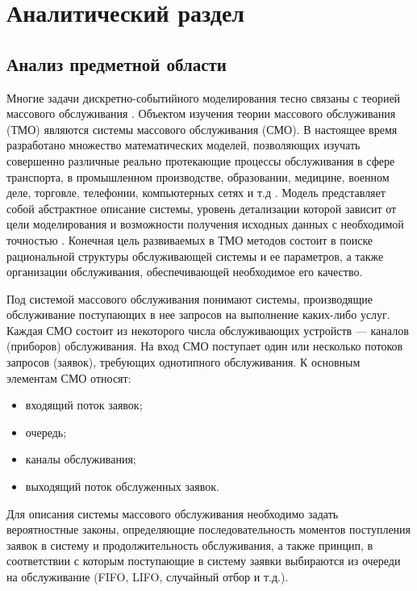 \chapter{Аналитический раздел}

\section{Анализ предметной области}
Многие задачи дискретно-событийного моделирования тесно связаны с теорией
массового обслуживания \cite{imitation_modelling_def}. Объектом изучения теории массового обслуживания (ТМО) являются системы массового обслуживания (СМО). В настоящее время разработано множество математических моделей, позволяющих изучать совершенно различные реально протекающие процессы обслуживания в сфере транспорта, в промышленном производстве, образовании, медицине, военном деле, торговле, телефонии, компьютерных сетях и т.д \cite{gpss}. Модель представляет собой абстрактное описание системы, уровень детализации которой зависит от цели моделирования и возможности получения исходных данных с необходимой точностью \cite{mass_service_systems}. Конечная цель развиваемых в ТМО методов состоит в поиске рациональной структуры обслуживающей системы и ее параметров, а также организации обслуживания, обеспечивающей необходимое его качество.

Под системой массового обслуживания понимают системы, производящие обслуживание поступающих в нее запросов на выполнение каких-либо услуг. Каждая СМО состоит из некоторого числа обслуживающих устройств --- каналов (приборов) обслуживания.
На вход СМО поступает один или несколько потоков запросов (заявок), требующих однотипного обслуживания. К основным элементам СМО относят:
\begin{itemize}
	\item входящий поток заявок;
	\item очередь;
	\item каналы обслуживания;
	\item выходящий поток обслуженных заявок.	
\end{itemize}

Для описания системы массового обслуживания необходимо задать вероятностные законы, определяющие последовательность моментов поступления заявок в систему и продолжительность обслуживания, а также принцип, в соответствии с которым поступающие в систему заявки выбираются из очереди на обслуживание (FIFO, LIFO, случайный отбор и т.д.).

